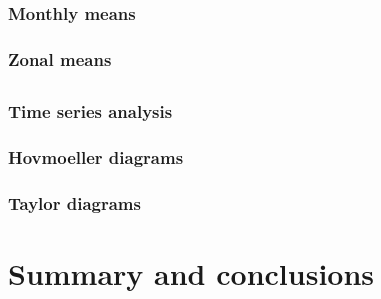 \documentclass[a4paper,11pt]{article}
\begin{document}
\FloatBarrier
\subsubsection{Monthly means}\label{sss:averages}


\FloatBarrier
\subsubsection{Zonal means}\label{sss:zonalmeans}



\subsection{\timeseries}\label{subsec:timeseries}

\FloatBarrier
\subsubsection{Time series analysis}\label{sss:simple_time_series}


\FloatBarrier
\subsubsection{Hovmoeller diagrams}\label{sss:hovmoeller}


\FloatBarrier
\subsubsection{Taylor diagrams}\label{sss:taylor}



\section{Summary and conclusions}\label{sec:sum_and_con}


\newpage
{}

%

\end{document}
